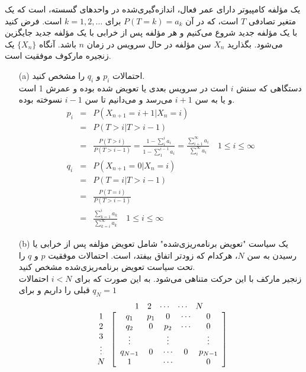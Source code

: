 \documentclass[11pt, a4, twoside]{article}
\begin{document}
	\begin{problem} %
    یک مؤلفه کامپیوتر دارای عمر فعال، اندازه‌گیری‌شده در واحدهای گسسته، است که یک متغیر تصادفی $T$ است، که در آن $P(T = k) = a_k$ برای $k = 1, 2, \dots$ است. فرض کنید با یک مؤلفه جدید شروع می‌کنیم و هر مؤلفه پس از خرابی با یک مؤلفه جدید جایگزین می‌شود. بگذارید $X_n$ سن مؤلفه در حال سرویس در زمان $n$ باشد. آنگاه $\{X_n\}$ یک زنجیره مارکوف موفقیت است.
    \begin{itemize}
        \item[(a)] احتمالات $p_i$ و $q_i$ را مشخص کنید. \\
        {\color{blue}
		دستگاهی که سنش \(i\) است در سرویس بعدی یا تعویض شده بوده و عمرش 1 است و  یا به سن \(i+1\) می‌رسد و می‌دانیم تا سن \(i-1\) نسوخته بوده.
		\begin{eqnarray*}
			p_i &=& P(X_{n+1} = i + 1 | X_n = i) \\
			&=& P(T > i | T > i - 1) \\
			&=& \frac{P(T > i)}{P(T > i - 1)} = \frac{1 - \sum_i^i a_i}{1-\sum_1^{i-1} a_i} = \frac{\sum^\infty_{i+1} a_i}{\sum_i^\infty a_i} \quad 1 \le i \le \infty \\
			q_i &=& P(X_{n+1} = 0 | X_n = i) \\
			&=& P(T = i | T > i - 1) \\
			&=& \frac{P(T = i)}{P(T > i - 1)} \\
			&=& \frac{\sum_{k=1}^{i} a_k}{\sum_{k=i}^{\infty} a_k} \quad 1 \le i \le \infty
		\end{eqnarray*}
		}
        \item[(b)] یک سیاست "تعویض برنامه‌ریزی‌شده" شامل تعویض مؤلفه پس از خرابی یا رسیدن به سن $N$، هرکدام که زودتر اتفاق بیفتد، است. احتمالات موفقیت $p$ و $q$ را تحت سیاست تعویض برنامه‌ریزی‌شده مشخص کنید. \\
        {\color{blue} 
		زنجیر مارکف با این حرکت متناهی می‌شود. به این صورت که 
		برای \(i < N\) احتمالات قبلی را داریم و برای \(q_N = 1\)
		\[\begin{array}{c@{\hspace{2pt}}c}
			& 
			\begin{array}{ccccc}
				1 & 2 & \cdots & \cdots & N
			\end{array} \\
			\begin{array}{c}
				1 \\ 2 \\ 3 \\ \vdots \\ N
			\end{array} &
			\left[
			\begin{array}{ccccc}
				q_1 & p_1 & 0 	& \cdots & 0    \\
				q_2 & 0   & p_2 & \cdots & 0   \\
				\vdots &  & \vdots  &    & \vdots   \\
				q_{N-1}  & 0  & \cdots   & 0   & p_{N-1} \\
				1   &    & \cdots  &   & 0  \\
			\end{array}
			\right]
		\end{array}\]
		}
    \end{itemize} 
	\end{problem}
\end{document}
